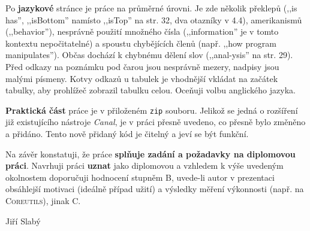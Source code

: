 \documentclass{article}
\begin{document}
Po \textbf{jazykové} stránce je práce na průměrné úrovni. Je zde několik
překlepů (,,is has'', ,,isBottom'' namísto ,,isTop'' na str. 32, dva otazníky
v 4.4), amerikanismů (,,behavior''), nesprávně použití množného čísla
(,,information'' je v tomto kontextu nepočitatelné) a spoustu chybějících
členů (např. ,,how program manipulates''). Občas dochází k chybnému dělení
slov (,,anal-ysis'' na str. 29). Před odkazy na poznámku pod čarou jsou
nesprávně mezery, nadpisy jsou malými písmeny. Kotvy odkazů u tabulek je
vhodnější vkládat na začátek tabulky, aby prohlížeč zobrazil tabulku celou.
Oceňuji volbu anglického jazyka.

\textbf{Praktická část} práce je v přiloženém \texttt{zip} souboru. Jelikož se
jedná o rozšíření již existujícího nástroje \emph{Canal}, je v práci přesně
uvedeno, co přesně bylo změněno a přidáno. Tento nově přidaný kód je čitelný a
jeví se být funkční.

Na závěr konstatuji, že práce \textbf{splňuje zadání a požadavky na
diplomovou práci}. Navrhuji práci \textbf{uznat} jako diplomovou a vzhledem
k výše uvedeným okolnostem doporučuji hodnocení stupněm B, uvede-li autor v
prezentaci obsáhlejší motivaci (ideálně případ užití) a výsledky měření
výkonnosti (např. na \textsc{Coreutils}), jinak C.

\vspace{3em}
\begin{flushright}
Jiří Slabý
\end{flushright}
\end{document}
